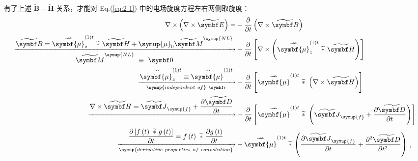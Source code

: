 有了上述 $\widetilde{\symbf B}-\widetilde{\symbf H}$ 关系，才能对 Eq.(\ref{eq:2-1}) 中的电场旋度方程左右两侧取旋度：
\begin{subequations} \label{eq:2-5}
\abovedisplayshortskip=0pt
\abovedisplayskip=0pt
\begin{align}
	\nabla \times \left( \nabla \times \widetilde{\symbf E} \right) = &- \displaystyle{\frac{\partial}{\partial t}} \left( \nabla \times \widetilde{\symbf B} \right) \label{eq:2-5a}\\ \xrightarrow[\displaystyle{ \widetilde{\symbf M}^{\symup{NL}}\ \equiv\ \symbf 0 }]{\displaystyle{ \widetilde{\symbf B} = \overset{\rightharpoonup\!\!\!\! \rightharpoonup}{\symbf{\mu}}^{(1)t}_{z}\ \widetilde *\ \widetilde{\symbf H} + {\symup{\mu}}_0 \widetilde{\symbf M}^{\symup{NL}}}} &- \displaystyle{\frac{\partial }{\partial t}} \left[ \nabla \times \left( \overset{\rightharpoonup\!\!\!\! \rightharpoonup}{\symbf{\mu}}^{(1)t}_{z}\ \widetilde *\ \widetilde{\symbf H} \right) \right] \label{eq:2-5b}\\ \xrightarrow[{\symup{independent\ of}}\ \symbf r]{\displaystyle{ \overset{\rightharpoonup\!\!\!\! \rightharpoonup}{\symbf{\mu}}^{(1)t}_{z}} \equiv \overset{\rightharpoonup\!\!\!\! \rightharpoonup}{\symbf{\mu}}^{(1)t}} &- \displaystyle{\frac{\partial }{\partial t}} \left[ \overset{\rightharpoonup\!\!\!\! \rightharpoonup}{\symbf{\mu}}^{(1)t}\ \widetilde *\ \left( \nabla \times \widetilde{\symbf H} \right) \right] \label{eq:2-5c}\\ \xrightarrow[]{\displaystyle{ \nabla \times \widetilde{\symbf H} = \widetilde{\symbf J}_{\symup{f}} + \frac{\partial \widetilde{\symbf D}}{\partial t}}} &- \displaystyle{\frac{\partial }{\partial t}} \left[ \overset{\rightharpoonup\!\!\!\! \rightharpoonup}{\symbf{\mu}}^{(1)t}\ \widetilde *\ \left( \widetilde{\symbf J}_{\symup{f}} + \frac{\partial \widetilde{\symbf D}}{\partial t} \right) \right] \label{eq:2-5d}\\ \xrightarrow[{\symup{derivative\ properties\ of\ convolution}}]{\displaystyle{ \frac{\partial \left[ f\left( t \right) \ \widetilde *\ g\left( t \right) \right]}{\partial t} = f\left( t \right) \ \widetilde *\ \frac{\partial g\left( t \right) }{\partial t }}} &- \overset{\rightharpoonup\!\!\!\! \rightharpoonup}{\symbf{\mu}}^{(1)t}\ \widetilde *\  \displaystyle{\left( \frac{\partial \widetilde{\symbf J}_{\symup{f}}}{\partial t } + \frac{\partial^2 \widetilde{\symbf D}}{\partial t^2} \right)} \label{eq:2-5e}~,
\end{align}
\end{subequations}
